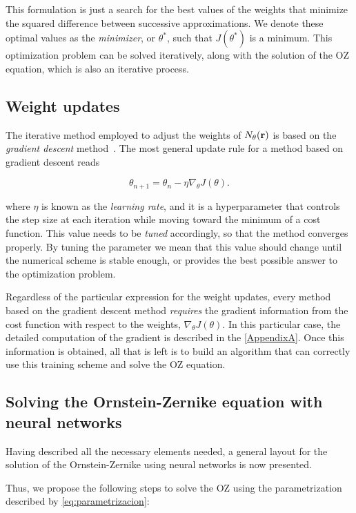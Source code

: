 This formulation is just a search for the best values of the weights that minimize
the squared difference between successive approximations. We denote these optimal values
as the \emph{minimizer}, or $\theta^{*}$, such that $J(\theta^{*})$ is a minimum.
This optimization problem can be solved iteratively, along with the solution of the
OZ equation, which is also an iterative process.

\subsection{Weight updates}
The iterative method employed to adjust the weights of $N_{\theta}(\mathbf{r})$ is based on the
\emph{gradient descent} method~\cite{nocedalNumericalOptimization2006}.
The most general update rule for a method based on gradient descent reads

\begin{equation}
    \theta_{n+1} = \theta_n - \eta \nabla_{\theta} J(\theta) .
    \label{eq:gradiente}
\end{equation}

where $\eta$ is known as the \emph{learning rate}, and it is a hyperparameter
that controls the step size at each iteration while moving toward the minimum
of a cost function. This value needs to be \emph{tuned} accordingly, so
that the method converges properly. By tuning the parameter we mean that this value
should change until the numerical scheme is stable enough, or provides the best
possible answer to the optimization problem.

Regardless of the particular expression for the weight updates, every method
based on the gradient descent method \emph{requires} the gradient information from
the cost function with respect to the weights, $\nabla_{\theta} J(\theta)$.
In this particular case, the detailed computation of the gradient is described in
the \autoref{AppendixA}.
Once this information is obtained, all that is left is to build an algorithm that
can correctly use this training scheme and solve the OZ equation.

\subsection{Solving the Ornstein-Zernike equation with neural networks}
Having described all the necessary elements needed, a general layout for the solution
of the Ornstein-Zernike using neural networks is now presented.

Thus, we propose the following steps to solve the OZ using the parametrization
described by \autoref{eq:parametrizacion}:

